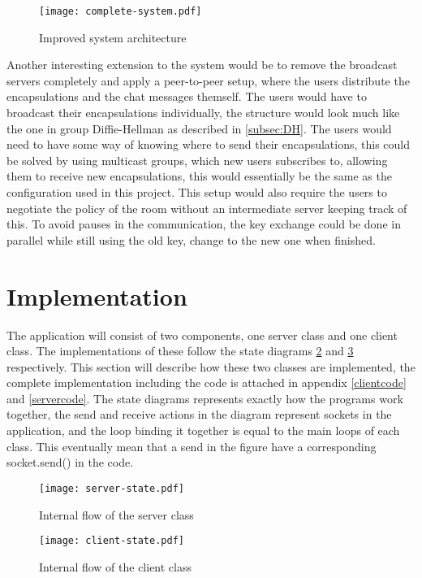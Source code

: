 \begin{figure}
\centering
\texttt{[image: complete-system.pdf]}
\caption{Improved system architecture}
\label{fig:improved}
\end{figure}

Another interesting extension to the system would be to remove the broadcast servers completely and apply a peer-to-peer setup, where the users distribute the encapsulations and the chat messages themself. The users would have to broadcast their encapsulations individually, the structure would look much like the one in group Diffie-Hellman as described in \ref{subsec:DH}. The users would need to have some way of knowing where to send their encapsulations, this could be solved by using multicast groups, which new users subscribes to, allowing them to receive new encapsulations, this would essentially be the same as the configuration used in this project. This setup would also require the users to negotiate the policy of the room without an intermediate server keeping track of this. To avoid pauses in the communication, the key exchange could be done in parallel while still using the old key, change to the new one when finished. 




\section{Implementation}
The application will consist of two components, one server class and one client class. The implementations of these follow the state diagrams \ref{fig:server-state} and \ref{fig:client-state} respectively. This section will describe how these two classes are implemented, the complete implementation including the code is attached in appendix \ref{clientcode} and \ref{servercode}. The state diagrams represents exactly how the programs work together, the send and receive actions in the diagram represent sockets in the application, and the loop binding it together is equal to the main loops of each class. This eventually mean that a send in the figure have a corresponding socket.send() in the code.

\begin{figure}
\centering
\texttt{[image: server-state.pdf]}
\caption{Internal flow of the server class}
\label{fig:server-state}
\end{figure}


\begin{figure}
\centering
\texttt{[image: client-state.pdf]}
\caption{Internal flow of the client class}
\label{fig:client-state}
\end{figure}

